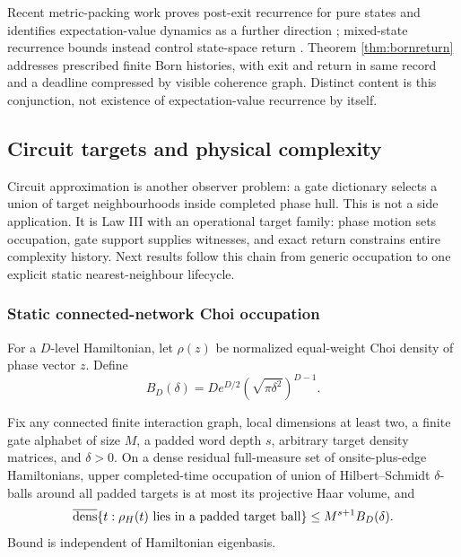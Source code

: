 Recent metric-packing work proves post-exit recurrence for pure states and
identifies expectation-value dynamics as a further direction
\cite{KotowskiOszmaniec2026}; mixed-state recurrence bounds instead control
state-space return \cite{GimenoSotoca2017}.  Theorem \ref{thm:bornreturn}
addresses prescribed finite Born histories, with exit and return in same
record and a deadline compressed by visible coherence graph.  Distinct
content is this conjunction, not existence of expectation-value recurrence
by itself.

\subsection{Circuit targets and physical complexity}

Circuit approximation is another observer problem: a gate dictionary selects
a union of target neighbourhoods inside completed phase hull.  This is not a
side application.  It is Law III with an operational target family: phase
motion sets occupation, gate support supplies witnesses, and exact return
constrains entire complexity history.  Next results follow this chain from
generic occupation to one explicit static nearest-neighbour lifecycle.

\subsubsection{Static connected-network Choi occupation}

For a $D$-level Hamiltonian, let $\rho(z)$ be normalized equal-weight Choi
density of phase vector $z$.  Define
\begin{equation}
 B_D(\delta)=D e^{D/2}\left(\sqrt{\pi\delta^2}\right)^{D-1}.
 \label{eq:choicap}
\end{equation}

\begin{theorem}
\label{thm:choicap}
Fix any connected finite interaction graph, local dimensions at least two,
a finite gate alphabet of size $M$, a padded word depth $s$, arbitrary target
density matrices, and $\delta>0$.  On a dense residual full-measure set of
onsite-plus-edge Hamiltonians, upper completed-time occupation of union of
Hilbert--Schmidt $\delta$-balls around all padded targets is at most its
projective Haar volume, and
\begin{equation}
 \overline{\operatorname{dens}}\{t:\rho_H(t)\text{ lies in a padded target ball}\}
 \le M^{s+1}B_D(\delta).                              \label{eq:staticplateau}
\end{equation}
Bound is independent of Hamiltonian eigenbasis.
\end{theorem}

